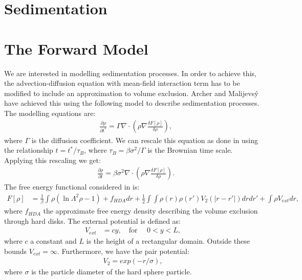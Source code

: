 \documentclass[11pt, a4paper]{article}
\theoremstyle{definition}
\begin{document}
\section*{Sedimentation}
\section{The Forward Model}
We are interested in modelling sedimentation processes. In order to achieve this, the advection-diffusion equation with mean-field interaction term has to be modified to include an approximation to volume exclusion. Archer and Malijevs\'y \cite{ArcherSed1} have achieved this using the following model to describe sedimentation processes. 
The modelling equations are:
\begin{align*}
	&\frac{\partial \rho}{\partial t^*} = \Gamma\nabla \cdot \left(  \rho \nabla \frac{\delta F[\rho]}{\delta \rho} \right) ,
\end{align*}
where $\Gamma$ is the diffusion coefficient. 	
We can rescale this equation as done in \cite{ArcherSed1} using the relationship $t = t^*/ \tau_B$, where $\tau_B = \beta \sigma^2 / \Gamma$ is the Brownian time scale.
Applying this rescaling we get:
\begin{align}\label{Eq1}
	&\frac{\partial \rho}{\partial t} = \beta \sigma^2\nabla \cdot \left(  \rho \nabla \frac{\delta F[\rho]}{\delta \rho} \right).
\end{align}
The free energy functional considered in \cite{ArcherSed1} is:
\begin{align*}
	F[\rho] &= \frac{1}{\beta} \int \rho (\ln \Lambda^2 \rho - 1) + f_{HDA} dr + \frac{1}{2}\int \int \rho(r) \rho(r') V_2(|r - r'|) dr dr' + \int \rho V_{ext} dr,
\end{align*}
where $f_{HDA}$ the approximate free energy density describing the volume exclusion through hard disks. The external potential is defined as:
\begin{align*}
	V_{ext} &= c y, \quad \text{for } \quad 0 < y < L,
\end{align*}
where $c$ a constant and $L$ is the height of a rectangular domain. Outside these bounds $V_{ext} = \infty$. 
Furthermore, we have the pair potential:
\begin{align*}
	V_2 = exp(-r/\sigma),
\end{align*}
where $\sigma$ is the particle diameter of the hard sphere particle.
\end{document}
